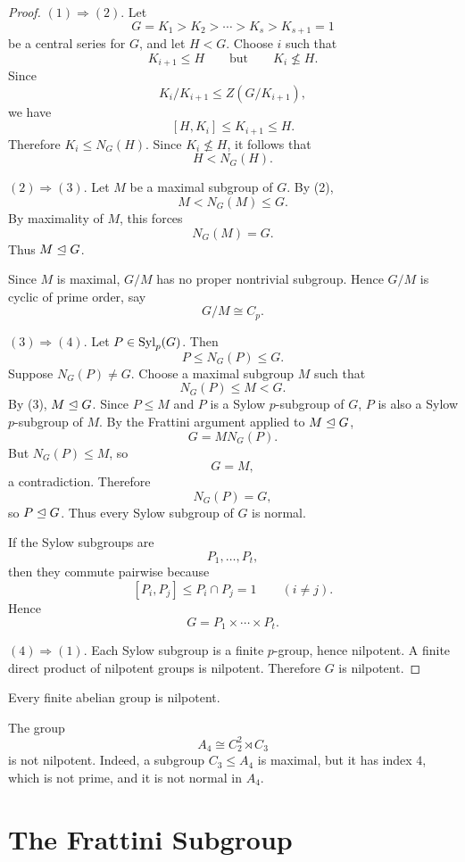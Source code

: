 \begin{proof}
\((1)\Rightarrow (2)\).
Let
\[
    G=K_1>K_2>\cdots>K_s>K_{s+1}=1
\]
be a central series for \(G\), and let \(H<G\). Choose \(i\) such that
\[
    K_{i+1}\leq H
    \qquad\text{but}\qquad
    K_i\nleq H.
\]
Since
\[
    K_i/K_{i+1}\leq Z(G/K_{i+1}),
\]
we have
\[
    [H,K_i]\leq K_{i+1}\leq H.
\]
Therefore \(K_i\leq N_G(H)\). Since \(K_i\nleq H\), it follows that
\[
    H<N_G(H).
\]

\((2)\Rightarrow (3)\).
Let \(M\) be a maximal subgroup of \(G\). By (2),
\[
    M<N_G(M)\leq G.
\]
By maximality of \(M\), this forces
\[
    N_G(M)=G.
\]
Thus \(M\trianglelefteq G\).

Since \(M\) is maximal, \(G/M\) has no proper nontrivial subgroup. Hence
\(G/M\) is cyclic of prime order, say
\[
    G/M\cong C_p.
\]

\((3)\Rightarrow (4)\).
Let \(P\in \operatorname{Syl}_p(G)\). Then
\[
    P\leq N_G(P)\leq G.
\]
Suppose \(N_G(P)\neq G\). Choose a maximal subgroup \(M\) such that
\[
    N_G(P)\leq M<G.
\]
By (3), \(M\trianglelefteq G\). Since \(P\leq M\) and \(P\) is a Sylow \(p\)-subgroup
of \(G\), \(P\) is also a Sylow \(p\)-subgroup of \(M\). By the Frattini
argument applied to \(M\trianglelefteq G\),
\[
    G=M N_G(P).
\]
But \(N_G(P)\leq M\), so
\[
    G=M,
\]
a contradiction. Therefore
\[
    N_G(P)=G,
\]
so \(P\trianglelefteq G\). Thus every Sylow subgroup of \(G\) is normal.

If the Sylow subgroups are
\[
    P_1,\dots,P_t,
\]
then they commute pairwise because
\[
    [P_i,P_j]\leq P_i\cap P_j=1
    \qquad (i\neq j).
\]
Hence
\[
    G=P_1\times \cdots \times P_t.
\]

\((4)\Rightarrow (1)\).
Each Sylow subgroup is a finite \(p\)-group, hence nilpotent. A finite direct
product of nilpotent groups is nilpotent. Therefore \(G\) is nilpotent.
\end{proof}

\begin{example}
Every finite abelian group is nilpotent.
\end{example}

\begin{example}
The group
\[
    A_4\cong C_2^2\rtimes C_3
\]
is not nilpotent. Indeed, a subgroup \(C_3\leq A_4\) is maximal, but it has
index \(4\), which is not prime, and it is not normal in \(A_4\).
\end{example}

\section{The Frattini Subgroup}

